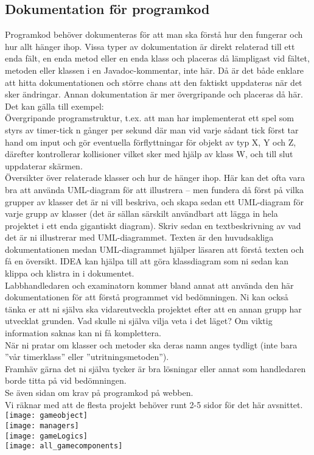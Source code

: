 \subsection{Dokumentation för programkod}
{\color{red}Programkod behöver dokumenteras för att man ska förstå hur den fungerar och hur allt hänger ihop.  Vissa typer av dokumentation är direkt relaterad till ett enda fält, en enda metod eller en enda klass och placeras då lämpligast vid fältet, metoden eller klassen i en Javadoc-kommentar, inte här.  Då är det både enklare att hitta dokumentationen och större chans att den faktiskt uppdateras när det sker ändringar.  Annan dokumentation är mer övergripande och placeras då här.  Det kan gälla till exempel:\\}
{\color{red}Övergripande programstruktur, t.ex. att man har implementerat ett spel som styrs av timer-tick n gånger per sekund där man vid varje sådant tick först tar hand om input och gör eventuella förflyttningar för objekt av typ X, Y och Z, därefter kontrollerar kollisioner vilket sker med hjälp av klass W, och till slut uppdaterar skärmen.\\}
\vspace{11pt}
{\color{red}Översikter över relaterade klasser och hur de hänger ihop.  Här kan det ofta vara bra att använda UML-diagram för att illustrera – men fundera då först på vilka grupper av klasser det är ni vill beskriva, och skapa sedan ett UML-diagram för varje grupp av klasser (det är sällan särskilt användbart att lägga in hela projektet i ett enda gigantiskt diagram).  Skriv sedan en textbeskrivning av vad det är ni illustrerar med UML-diagrammet.  Texten är den huvudsakliga dokumentationen medan UML-diagrammet hjälper läsaren att förstå texten och få en översikt.  IDEA kan hjälpa till att göra klassdiagram som ni sedan kan klippa och klistra in i dokumentet.\\}
\vspace{11pt}
{\color{red}Labbhandledaren och examinatorn kommer bland annat att använda den här dokumentationen för att förstå programmet vid bedömningen.  Ni kan också tänka er att ni själva ska vidareutveckla projektet efter att en annan grupp har utvecklat grunden.  Vad skulle ni själva vilja veta i det läget?  Om viktig information saknas kan ni få komplettera.\\}
{\color{red}När ni pratar om klasser och metoder ska deras namn anges tydligt (inte bara ”vår timerklass” eller ”utritningsmetoden”).\\}
{\color{red}Framhäv gärna det ni själva tycker är bra lösningar eller annat som handledaren borde titta på vid bedömningen.\\}
{\color{red}Se även sidan om krav på programkod på webben.\\}
{\color{red}Vi räknar med att de flesta projekt behöver runt 2-5 sidor för det här avsnittet.\\}
\texttt{[image: gameobject]}\\
\texttt{[image: managers]}\\
\texttt{[image: gameLogics]}\\
\texttt{[image: all\_gamecomponents]}\\
